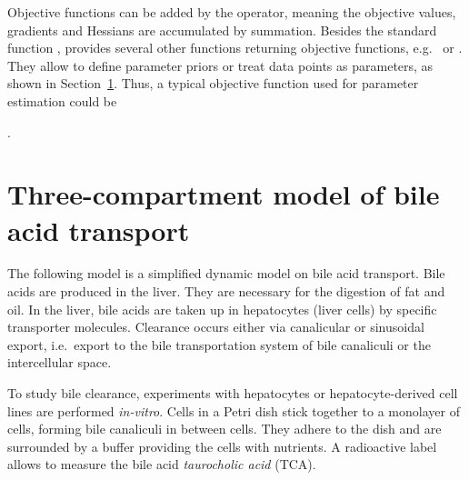 \documentclass[article]{jss}
\begin{document}
Objective functions can be added by the  operator, meaning the objective values, gradients and Hessians are accumulated by summation. Besides the standard function ,  provides several other functions returning objective functions, e.g.~ or . They allow to define parameter priors or treat data points as parameters, as shown in Section~\ref{sec:example}. Thus, a typical objective function used for parameter estimation could be
\begin{center}
	.
\end{center}


\section{Three-compartment model of bile acid transport}
\label{sec:example}

The following model is a simplified dynamic model on bile acid transport. Bile acids are produced in the liver. They are necessary for the digestion of fat and oil. In the liver, bile acids are taken up in hepatocytes (liver cells) by specific transporter molecules. Clearance occurs either via canalicular or sinusoidal export, i.e.~export to the bile transportation system of bile canaliculi or the intercellular space.

To study bile clearance, experiments with hepatocytes or hepatocyte-derived cell lines are performed \textit{in-vitro}. Cells in a Petri dish stick together to a monolayer of cells, forming bile canaliculi in between cells. They adhere to the dish and are surrounded by a buffer providing the cells with nutrients. A radioactive label allows to measure the bile acid \textit{taurocholic acid} (TCA).
\end{document}
